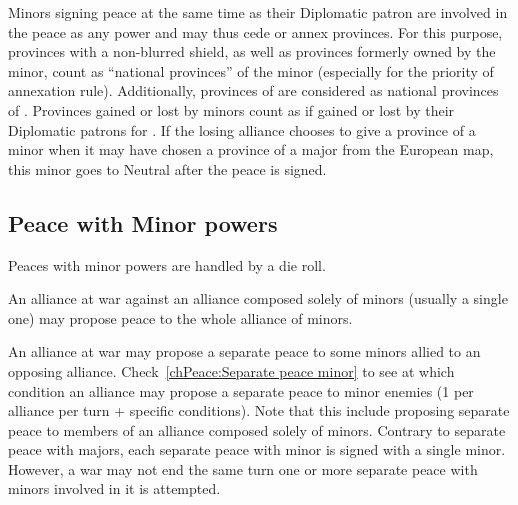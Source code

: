 \bparag Minors signing peace at the same time as their Diplomatic patron are
involved in the peace as any power and may thus cede or annex provinces.
\bparag For this purpose, provinces with a non-blurred shield, as well as
provinces formerly owned by the minor, count as ``national provinces'' of the
minor (especially for the priority of annexation rule).
\bparag Additionally, provinces of \regionBalkans are considered as national
provinces of \paysVenise.
\bparag Provinces gained or lost by minors count as if gained or lost by their
Diplomatic patrons for \VPs.
\bparag If the losing alliance chooses to give a province of a minor when it
may have chosen a province of a major from the European map, this minor goes
to Neutral after the peace is signed.

\subsection{Peace with Minor powers}\label{chPeace:Peace with Minors}
\aparag Peaces with minor powers are handled by a die roll.

 An alliance at war against an alliance composed solely
of minors (usually a single one) may propose peace to the whole alliance of
minors.

 An alliance at war may propose a separate peace to
some minors allied to an opposing alliance.
\bparag Check~\ref{chPeace:Separate peace minor} to see at which condition an
alliance may propose a separate peace to minor enemies (1 per alliance per
turn + specific conditions).
\bparag Note that this include proposing separate peace to members of an
alliance composed solely of minors.
\bparag Contrary to separate peace with majors, each separate peace with minor
is signed with a single minor. However, a war may not end the same turn one or
more separate peace with minors involved in it is attempted.


